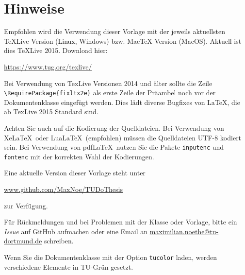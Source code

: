\thispagestyle{empty}
\setcounter{page}{2}
\section*{Hinweise}
Empfohlen wird die Verwendung dieser Vorlage mit der jeweils aktuellsten TeXLive Version (Linux, Windows) bzw. MacTeX Version (MacOS).
Aktuell ist dies TeXLive 2015. Download hier:
\begin{center}
  \href{https://www.tug.org/texlive/}{https://www.tug.org/texlive/}
\end{center}
Bei Verwendung von TexLive Versionen 2014 und älter sollte
die Zeile \verb+\RequirePackage{fixltx2e}+ als erste Zeile der Präambel
noch vor der Dokumentenklasse eingefügt werden.
Dies lädt diverse Bugfixes von LaTeX, die ab TexLive 2015 Standard sind.

Achten Sie auch auf die Kodierung der Quelldateien.
Bei Verwendung von Xe\LaTeX\ oder Lua\LaTeX\ (empfohlen) müssen die
Quelldateien UTF-8 kodiert sein.
Bei Verwendung von pdf\LaTeX\ nutzen Sie die Pakete \texttt{inputenc} und \texttt{fontenc} mit der korrekten Wahl der Kodierungen.

Eine aktuelle Version dieser Vorlage steht unter 
\begin{center}
  \href{https://github.com/MaxNoe/TUDoThesis}{www.github.com/MaxNoe/TUDoThesis}
\end{center}
zur Verfügung.

Für Rückmeldungen und bei Problemen mit der Klasse oder Vorlage, bitte ein \emph{Issue} auf GitHub aufmachen oder eine Email an
\href{mailto:maximilian.noethe@tu-dortmund.de}{maximilian.noethe@tu-dortmund.de} schreiben.

Wenn Sie die Dokumentenklasse mit der Option \texttt{tucolor} laden, werden verschiedene Elemente in TU-Grün gesetzt.
